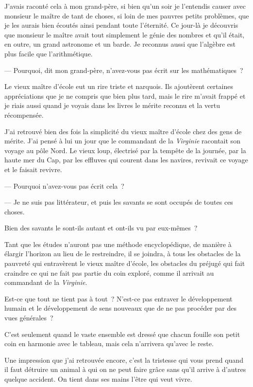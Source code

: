 \documentclass[french,twoside]{book} %
\begin{document}
J’avais raconté cela à mon grand-père, si bien qu’un soir je l’entendis causer avec monsieur le maître de tant de choses, si loin de mes pauvres petits problèmes, que je les aurais bien écoutés ainsi pendant toute l’éternité. Ce jour-là je découvris que monsieur le maître avait tout simplement le génie des nombres et qu’il était, en outre, un grand astronome et un barde. Je reconnus aussi que l’algèbre est plus facile que l’arithmétique.\par
— Pourquoi, dit mon grand-père, n’avez-vous pas écrit sur les mathématiques ?\par
Le vieux maître d’école eut un rire triste et narquois. Ils ajoutèrent certaines appréciations que je ne compris que bien plus tard, mais le rire m’avait frappé et je riais aussi quand je voyais dans les livres le mérite reconnu et la vertu récompensée.\par
 J’ai retrouvé bien des fois la simplicité du vieux maître d’école chez des gens de mérite. J’ai pensé à lui un jour que le commandant de la \emph{Virginie} racontait son voyage au pôle Nord. Le vieux loup, électrisé par la tempête de la journée, par la haute mer du Cap, par les effluves qui courent dans les navires, revivait ce voyage et le faisait revivre.\par
— Pourquoi n’avez-vous pas écrit cela ?\par
— Je ne suis pas littérateur, et puis les savants se sont occupés de toutes ces choses.\par
Bien des savants le sont-ils autant et ont-ils vu par eux-mêmes ?\par
Tant que les études n’auront pas une méthode encyclopédique, de manière à élargir l’horizon au lieu de le restreindre, il se joindra, à tous les obstacles de la pauvreté qui entravèrent le vieux maître d’école, les obstacles du préjugé qui fait craindre ce qui ne fait pas partie du coin exploré, comme il arrivait au commandant de la \emph{Virginie}.\par
Est-ce que tout ne tient pas à tout ? N’est-ce pas entraver le développement humain et le développement de sens nouveaux que de ne pas procéder par des vues générales ?\par
C’est seulement quand le vaste ensemble est dressé que chacun fouille son petit coin en harmonie  avec le tableau, mais cela n’arrivera qu’avec le reste.\par
Une impression que j’ai retrouvée encore, c’est la tristesse qui vous prend quand il faut détruire un animal à qui on ne peut faire grâce sans qu’il arrive à d’autres quelque accident. On tient dans ses mains l’être qui veut vivre.\par
\end{document}
